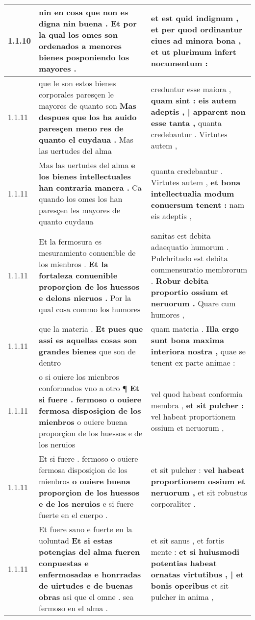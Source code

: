\begin{tabular}{|p{1cm}|p{6.5cm}|p{6.5cm}|}
1.1.10 & nin en cosa que non es digna nin buena . \textbf{ Et por la qual los omes son ordenados a menores bienes } posponiendo los mayores . & et est quid indignum , \textbf{ et per quod ordinantur ciues ad minora bona , } et ut plurimum infert nocumentum : \\\hline
1.1.11 & que le son estos bienes corporales paresçen le mayores de quanto son \textbf{ Mas despues que los ha auido paresçen meno res de quanto el cuydaua . } Mas las uertudes del alma & creduntur esse maiora , \textbf{ quam sint : eis autem adeptis , | apparent non esse tanta , } quanta credebantur . Virtutes autem , \\\hline
1.1.11 & Mas las uertudes del alma \textbf{ e los bienes intellectuales han contraria manera . } Ca quando los omes los han paresçen les mayores de quanto cuydaua & quanta credebantur . Virtutes autem , \textbf{ et bona intellectualia modum conuersum tenent : } nam eis adeptis , \\\hline
1.1.11 & Et la fermosura es mesuramiento conuenible de los mienbros . \textbf{ Et la fortaleza conuenible proporçion de los huessos e delons nieruos . } Por la qual cosa commo los humores & sanitas est debita adaequatio humorum . Pulchritudo est debita commensuratio membrorum . \textbf{ Robur debita proportio ossium et neruorum . } Quare cum humores , \\\hline
1.1.11 & que la materia . \textbf{ Et pues que assi es aquellas cosas son grandes bienes } que son de dentro & quam materia . \textbf{ Illa ergo sunt bona maxima interiora nostra , } quae se tenent ex parte animae : \\\hline
1.1.11 & o si ouiere los mienbros conformados vno a otro ¶ \textbf{ Et si fuere . fermoso o ouiere fermosa disposiçion de los mienbros } o ouiere buena proporçion de los huessos e de los neruios & vel quod habeat conformia membra , \textbf{ et sit pulcher : } vel habeat proportionem ossium et neruorum , \\\hline
1.1.11 & Et si fuere . fermoso o ouiere fermosa disposiçion de los mienbros \textbf{ o ouiere buena proporçion de los huessos e de los neruios } e si fuere fuerte en el cuerpo . & et sit pulcher : \textbf{ vel habeat proportionem ossium et neruorum , } et sit robustus corporaliter . \\\hline
1.1.11 & Et fuere sano e fuerte en la uoluntad \textbf{ Et si estas potençias del alma fueren conpuestas e enfermosadas e honrradas de uirtudes e de buenas obras } asi que el omne . sea fermoso en el alma . & et sit sanus , et fortis mente : \textbf{ et si huiusmodi potentias habeat ornatas virtutibus , | et bonis operibus } et sit pulcher in anima , \\\hline

\end{tabular}
